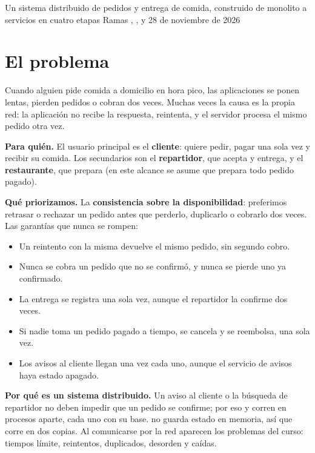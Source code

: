 \documentclass[11pt]{article}
\begin{document}
%
  {Un sistema distribuido de pedidos y entrega de comida, construido de monolito a servicios en cuatro etapas}%
  {Ramas , ,  y }{28 de noviembre de 2026}

\tableofcontents
\newpage

\section{El problema}

Cuando alguien pide comida a domicilio en hora pico, las aplicaciones se ponen lentas, pierden pedidos
o cobran dos veces. Muchas veces la causa es la propia red: la aplicación no recibe la respuesta,
reintenta, y el servidor procesa el mismo pedido otra vez.

\textbf{Para quién.} El usuario principal es el \textbf{cliente}: quiere pedir, pagar una sola vez y
recibir su comida. Los secundarios son el \textbf{repartidor}, que acepta y entrega, y el
\textbf{restaurante}, que prepara (en este alcance se asume que prepara todo pedido pagado).

\textbf{Qué priorizamos.} La \textbf{consistencia sobre la disponibilidad}: preferimos retrasar o
rechazar un pedido antes que perderlo, duplicarlo o cobrarlo dos veces. Las garantías que nunca se rompen:

\begin{itemize}
  \item Un reintento con la misma  devuelve el mismo pedido, sin segundo cobro.
  \item Nunca se cobra un pedido que no se confirmó, y nunca se pierde uno ya confirmado.
  \item La entrega se registra una sola vez, aunque el repartidor la confirme dos veces.
  \item Si nadie toma un pedido pagado a tiempo, se cancela y se reembolsa, una sola vez.
  \item Los avisos al cliente llegan una vez cada uno, aunque el servicio de avisos haya estado apagado.
\end{itemize}

\textbf{Por qué es un sistema distribuido.} Un aviso al cliente o la búsqueda de repartidor no deben
impedir que un pedido se confirme; por eso  y  corren en procesos
aparte, cada uno con su base.  no guarda estado en memoria, así que corre en dos copias.
Al comunicarse por la red aparecen los problemas del curso: tiempos límite, reintentos, duplicados,
desorden y caídas.
\end{document}
